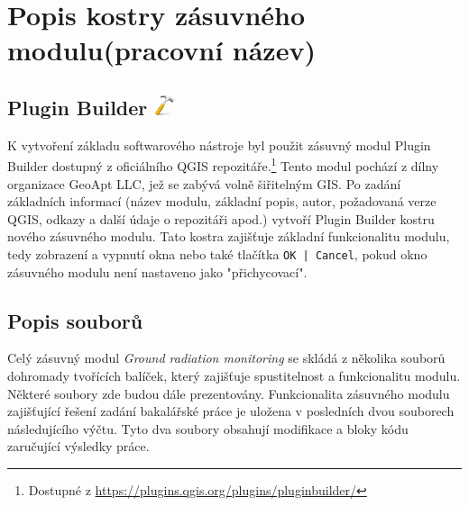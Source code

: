 \section{Popis kostry zásuvného modulu(pracovní název)}
\subsection[Plugin Builder]{Plugin Builder \includegraphics[scale=0.1]{./pictures/plugin_builder.png}}
K vytvoření základu softwarového nástroje byl použit zásuvný modul Plugin Builder dostupný z oficiálního QGIS repozitáře.\footnote{Dostupné z \url{https://plugins.qgis.org/plugins/pluginbuilder/}} Tento modul pochází z dílny organizace GeoApt LLC, jež se zabývá volně šiřitelným GIS. Po zadání základních informací (název modulu, základní popis, autor, požadovaná verze QGIS, odkazy a další údaje o repozitáři apod.) vytvoří Plugin Builder kostru nového zásuvného modulu. Tato kostra zajišťuje základní funkcionalitu modulu, tedy zobrazení a vypnutí okna nebo také tlačítka \texttt{OK | Cancel}, pokud okno zásuvného modulu není nastaveno jako "přichycovací". 

\subsection{Popis souborů}
Celý zásuvný modul \textit{Ground radiation monitoring} se skládá z několika souborů dohromady tvořících balíček, který zajišťuje spustitelnost a funkcionalitu modulu. Některé soubory zde budou dále prezentovány. Funkcionalita zásuvného modulu zajišťující řešení zadání bakalářské práce je uložena v posledních dvou souborech následujícího výčtu. Tyto dva soubory obsahují modifikace a bloky kódu zaručující výsledky práce. %

